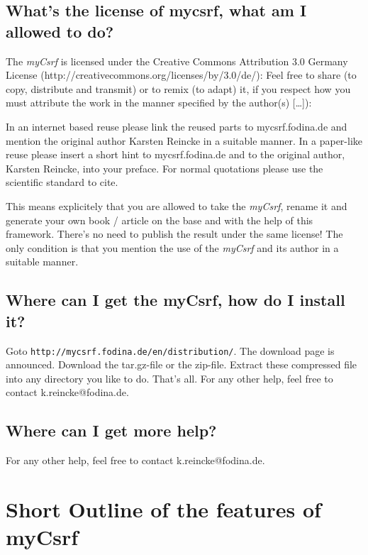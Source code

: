 \documentclass[DIV=calc,BCOR=5mm,11pt,headings=small,oneside,abstract=true, toc=bib]{scrartcl}
\begin{document}
\subsection{What's the license of mycsrf, what am I allowed to do?}
The \textit{myCsrf} is licensed under the Creative Commons Attribution
3.0 Germany License (http://creativecommons.org/licenses/by/3.0/de/): Feel free \glqq{}to share (to
copy, distribute and transmit)\grqq{} or \glqq{}to remix (to adapt)\grqq{} it,
if you respect how \glqq{}you must attribute the work in the manner specified by
the author(s) [\ldots]\grqq{}):

In an internet based reuse please link the reused parts to mycsrf.fodina.de and
mention the original author Karsten Reincke in a suitable manner. In a
paper-like reuse please insert a short hint to mycsrf.fodina.de and to the
original author, Karsten Reincke, into your preface. For normal quotations
please use the scientific standard to cite.

This means explicitely that you are allowed to take the
\textit{myCsrf}, rename it and generate your own book / article on
the base and with the help of this framework. There's no need to publish the
result under the same license! The only condition is that you mention the use of
the \textit{myCsrf} and its author in a suitable manner.

\subsection{Where can I get the myCsrf, how do I install it?}

Goto \texttt{http://mycsrf.fodina.de/en/distribution/}. The download page
is announced. Download the tar.gz-file or the zip-file. Extract these compressed
file into any directory you like to do. That's all. For any other help, feel
free to contact k.reincke@fodina.de.

\subsection{Where can I get more help?}

For any other help, feel free to contact k.reincke@fodina.de.


\section{Short Outline of the features of myCsrf}
\end{document}
